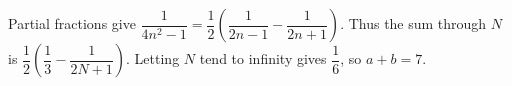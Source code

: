 Partial fractions give $\dfrac{1}{4n^2-1}=\dfrac{1}{2}(\dfrac{1}{2n-1}-\dfrac{1}{2n+1})$. Thus the sum through $N$ is $\dfrac{1}{2}(\dfrac{1}{3}-\dfrac{1}{2N+1})$. Letting $N$ tend to infinity gives $\dfrac{1}{6}$, so $a+b=\boxed7$.
